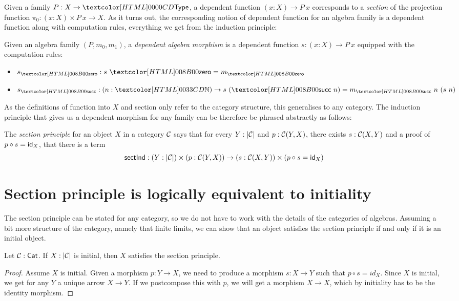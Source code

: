Given a family $P : X \to \Type$, a dependent function
$(x : X) \to P\ x$ corresponds to a \emph{section} of the projection
function $\pi_0 : (x : X) \times P\ x \to X$. As it turns out, the
corresponding notion of dependent function for an algebra family is a
dependent function along with computation rules, \ie everything we get
from the induction principle:

\begin{definition}
  Given an algebra family $(P,m_0,m_1)$, a \emph{dependent algebra
    morphism} is a dependent function $s : (x : X) \to P\ x$ equipped
  with the computation rules:
  \begin{itemize}
  \item $s_{\natzero} : s\ \natzero = m_{\natzero}$
  \item $s_{\natsucc} : (n : \natty) \to s\ (\natsucc\ n) = m_{\natsucc}\ n\ (s\ n)$
  \end{itemize}
\end{definition}

As the definitions of function into $X$ and section only refer to the
category structure, this generalises to any category. The induction
principle that gives us a dependent morphism for any family can be
therefore be phrased abstractly as follows:

\begin{definition}
  The \emph{section principle} for an object $X$ in a category $\mathcal{C}$
  says that for every $Y : | \mathcal{C} |$ and $p : \mathcal{C}(Y,X)$, there exists
  $s : \mathcal{C}(X,Y)$ and a proof of $p \circ s = \mathsf{id}_X$, \ie that there is
  a term
  \[
    \mathsf{sectInd} : (Y : | \mathcal{C} |) \times (p : \mathcal{C}(Y,X)) \to (s : \mathcal{C}(X,Y)) \times (p \circ s = \mathsf{id}_X)
  \]
\end{definition}

\section{Section principle is logically equivalent to initiality}

The section principle can be stated for any category, so we do not
have to work with the details of the categories of algebras. Assuming
a bit more structure of the category, namely that finite limits, we
can show that an object satisfies the section principle if and only if
it is an initial object.

\begin{lemma}
\label{thm:initToSec}
  Let $\mathcal{C}: \mathsf{Cat}$. If $X : | \mathcal{C} |$ is initial, then $X$ satisfies the
  section principle.
\end{lemma}
\begin{proof}
  Assume $X$ is initial. Given a morphism $p : Y \to X$, we need to
  produce a morphism $s : X \to Y$ such that $p \circ s = id_X$.
  Since $X$ is initial, we get for any $Y$ a unique arrow $X \to
  Y$. If we postcompose this with $p$, we will get a morphism
  $X \to X$, which by initiality has to be the identity morphism.
\end{proof}

